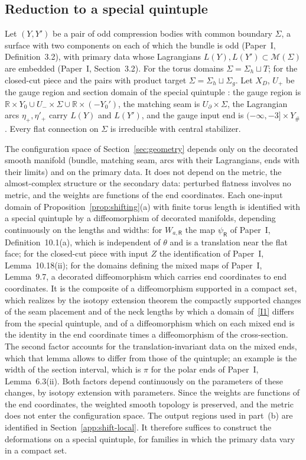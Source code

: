 \documentclass[11pt]{amsart}
\theoremstyle{definition}
\theoremstyle{remark}
\theoremstyle{plain}
\numberwithin{equation}{section}
\newcommand{\RR}{\mathbb R}
\begin{document}
\subsection{Reduction to a special quintuple}\label{app:shift-reduction}
Let $(Y,Y')$ be a pair of odd compression bodies with common boundary
$\Sigma$, a surface with two components on each of which the bundle is
odd (Paper~I, Definition~3.2), with primary data whose Lagrangians
$L(Y),L(Y')\subset\mathcal M(\Sigma)$ are embedded (Paper~I, Section~3.2).
For the torus domains $\Sigma=\Sigma_h\sqcup T$; for the closed-cut piece
and the pairs with product target $\Sigma=\Sigma_h\sqcup\Sigma_g$. Let
$X_D$, $U_+$ be the gauge region and section domain of the special
quintuple \cite[Section~3.1]{DFL}: the gauge region is
$\RR\times Y_0\cup U_-\times\Sigma\cup\RR\times(-Y_0')$, the matching seam is
$U_\partial\times\Sigma$, the Lagrangian arcs $\eta_+,\eta'_+$ carry $L(Y)$
and $L(Y')$, and the gauge input end is $(-\infty,-3]\times Y_\#$. Every
flat connection on $\Sigma$ is irreducible with central stabilizer.

The configuration space of Section~\ref{sec:geometry} depends only on the
decorated smooth manifold (bundle, matching seam, arcs with their
Lagrangians, ends with their limits) and on the primary data. It does
not depend on the metric, the almost-complex structure or the secondary
data: perturbed flatness involves no metric, and the weights are
functions of the end coordinates. Each one-input domain of
Proposition~\ref{prop:shifting}(a) with finite torus length is identified
with a special quintuple by a diffeomorphism of decorated manifolds,
depending continuously on the lengths and widths: for $W_{a,\mathsf R}$
the map $\psi_{\mathsf R}$ of Paper~I, Definition~10.1(a), which is
independent of $\theta$ and is a translation near the flat face; for the
closed-cut piece with input $Z$ the identification of Paper~I,
Lemma~10.18(ii); for the domains defining the mixed maps of Paper~I, Lemma~9.7, a
decorated diffeomorphism which carries end coordinates to end
coordinates. It is the composite of a diffeomorphism supported in a
compact set, which realizes by the isotopy extension theorem the
compactly supported changes of the seam placement and of the neck
lengths by which a domain of~\ref{I1} differs from the special
quintuple, and of a diffeomorphism which on
each mixed end is the identity in the end coordinate times a
diffeomorphism of the cross-section. The second factor accounts for the
translation-invariant data on the mixed ends, which that lemma allows to
differ from those of the quintuple; an example is the width of the
section interval, which is $\pi$ for the polar ends of Paper~I,
Lemma~6.3(ii). Both factors depend continuously on the parameters of
these changes, by isotopy extension with parameters. Since the weights are functions of
the end coordinates,
the weighted smooth topology is preserved, and the metric does not enter
the configuration space. The output regions used in part~(b) are identified in
Section~\ref{app:shift-local}. It therefore suffices to construct the
deformations on a special quintuple, for families in which the primary
data vary in a compact set.
\end{document}
